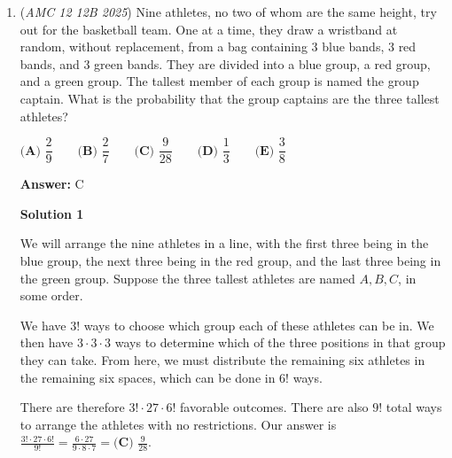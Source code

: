 \begin{enumerate}
 



\textbf{Solution 15 (Menelaus)}

Let $AC=2$, $AB=1$, hence $BC=\sqrt{3}$. If we use the diagram in Solution 1, first note that $\triangle ACB \sim \triangle ABD$ by AA with similar ratio 2, hence $AD=\frac{1}{2}$. Now, we use Menelaus' Theorem in $\triangle BAD$ with transversal line $EFC$:
 \[\frac{BE}{EA}\cdot \frac{AC}{CD} \cdot \frac{DF}{FB}=1\]
 \[\implies \frac{1}{1} \cdot \frac{2}{\frac{3}{2}} \cdot \frac{x}{y}=1\]
 \[\implies \frac{x}{y}=\frac{3}{4}\]So $\frac{x}{x+y}=\boxed{\frac{3}{7} (A)}$.

 


	\item (\textit{AMC 12 12B 2025}) Nine athletes, no two of whom are the same height, try out for the basketball team. One at a time, they draw a wristband at random, without replacement, from a bag containing $3$ blue bands, $3$ red bands, and $3$ green bands. They are divided into a blue group, a red group, and a green group. The tallest member of each group is named the group captain. What is the probability that the group captains are the three tallest athletes?


 $\textbf{(A) } \dfrac{2}{9} \qquad \textbf{(B) } \dfrac{2}{7} \qquad \textbf{(C) } \dfrac{9}{28} \qquad \textbf{(D) } \dfrac{1}{3}  \qquad \textbf{(E) } \dfrac{3}{8}$

 \textbf{Answer: }C



\textbf{Solution 1}

We will arrange the nine athletes in a line, with the first three being in the blue group, the next three being in the red group, and the last three being in the green group. Suppose the three tallest athletes are named $A, B, C$, in some order. 

 We have $3!$ ways to choose which group each of these athletes can be in. We then have $3 \cdot 3 \cdot 3$ ways to determine which of the three positions in that group they can take. From here, we must distribute the remaining six athletes in the remaining six spaces, which can be done in $6!$ ways.

 There are therefore $3! \cdot 27 \cdot 6!$ favorable outcomes. There are also $9!$ total ways to arrange the athletes with no restrictions. Our answer is $\frac{3! \cdot 27 \cdot 6!}{9!} = \frac{6 \cdot 27}{9 \cdot 8 \cdot 7} = \boxed{\textbf{(C) }\frac{9}{28}}.$





\end{enumerate}
